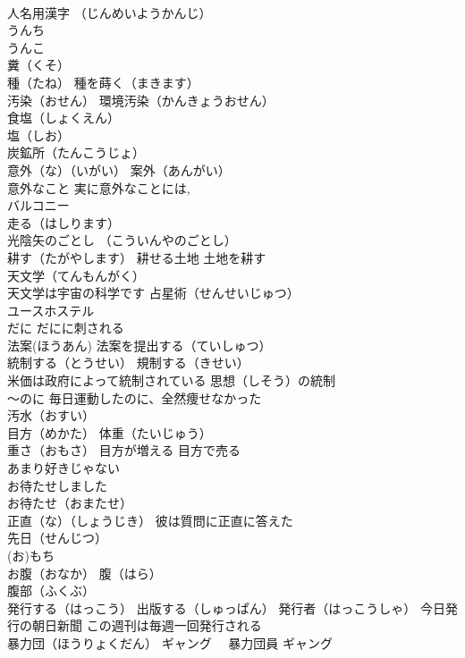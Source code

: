 \documentclass[8pt]{extreport}
\begin{document}
\begin{CJK}{UTF8}{min}
\\	人名用漢字 （じんめいようかんじ）
\\	うんち
\\	うんこ
\\	糞（くそ）
\\	種（たね） 種を蒔く（まきます）
\\	汚染（おせん） 環境汚染（かんきょうおせん）
\\	食塩（しょくえん） 
\\	塩（しお）
\\	炭鉱所（たんこうじょ）
\\	意外（な）（いがい） 案外（あんがい） 
\\	意外なこと 実に意外なことには, 
\\	バルコニー
\\	走る（はしります）
\\	光陰矢のごとし （こういんやのごとし）
\\	耕す（たがやします） 耕せる土地 土地を耕す
\\	天文学（てんもんがく） 
\\	天文学は宇宙の科学です 占星術（せんせいじゅつ）
\\	ユースホステル
\\	だに だにに刺される
\\	法案(ほうあん) 法案を提出する（ていしゅつ）
\\	統制する（とうせい） 規制する（きせい） 
\\	米価は政府によって統制されている 思想（しそう）の統制
\\	～のに 毎日運動したのに、全然痩せなかった
\\	汚水（おすい）
\\	目方（めかた） 体重（たいじゅう） 
\\	重さ（おもさ） 目方が増える 目方で売る
\\	あまり好きじゃない
\\	お待たせしました 
\\	お待たせ（おまたせ） 
\\	正直（な）（しょうじき） 彼は質問に正直に答えた
\\	先日（せんじつ）
\\	(お)もち
\\	お腹（おなか） 腹（はら）
\\	腹部（ふくぶ） 
\\	発行する（はっこう） 出版する（しゅっぱん） 発行者（はっこうしゃ） 今日発行の朝日新聞 この週刊は毎週一回発行される
\\	暴力団（ほうりょくだん） ギャング　 暴力団員 ギャング 

\end{CJK}
\end{document}
